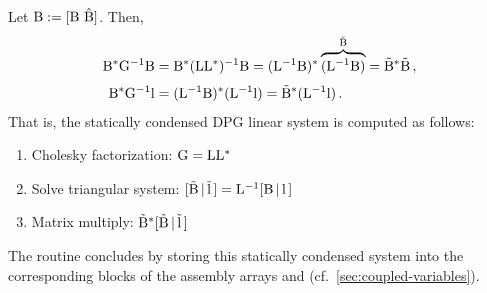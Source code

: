 Let $\mathrm{B} := [\mathrm{B}\ \mathrm{\hat B}]$. Then, \vskip -30pt
\begin{align*}
	\mathrm{B^*} \mathrm{G^{-1}} \mathrm{B} &= 
	\mathrm{B^*} \mathrm{(L L^*)^{-1}} \mathrm{B} =
	( \mathrm{L^{-1}} \mathrm{B} )^* \overbrace{( \mathrm{L^{-1}} \mathrm{B} )}^{\mathrm{\tilde B}} =
	\mathrm{\tilde B}^* \mathrm{\tilde B} \, ,
	\\[3pt]
	\mathrm{B^*} \mathrm{G^{-1}} \mathrm{l} &=
	( \mathrm{L^{-1}} \mathrm{B} )^* ( \mathrm{L^{-1} l} ) =
	\mathrm{\tilde B}^* ( \mathrm{L^{-1} l} ) \, .
\end{align*}
That is, the statically condensed DPG linear system is computed as follows:
\begin{enumerate}
	\itemsep 0pt
	\item Cholesky factorization: \hskip 7pt 
	$\mathrm{G = L L^*}$
	\item Solve triangular system: \hskip 2pt 
	$\mathrm{[\tilde B \, | \, \tilde l \,] = L^{-1} [B \, | \, l \,]}$
	\item Matrix multiply: \hskip 37pt 
	$\mathrm{\tilde B^* [\tilde B \, | \, \tilde l \,]}$
\end{enumerate}
The  routine concludes by storing this statically condensed system into the corresponding blocks of the assembly arrays  and  (cf.~\ref{sec:coupled-variables}).

%


